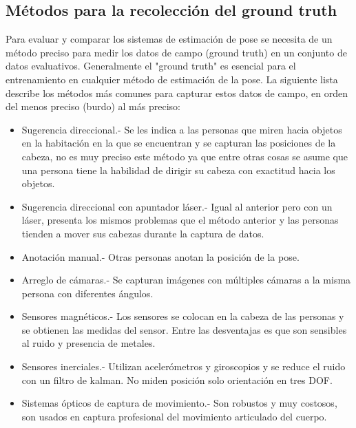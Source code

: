 \subsection{Métodos para la recolección del ground truth}
Para evaluar y comparar los sistemas de estimación de pose se necesita de un método preciso para medir los datos de campo (ground truth) en un conjunto de datos evaluativos. Generalmente el "ground truth" es esencial para el entrenamiento en cualquier método de estimación de la pose. La siguiente lista describe los métodos más comunes para capturar estos datos de campo, en orden del menos preciso (burdo) al más preciso:
\begin{itemize}
	\item Sugerencia direccional.- Se les indica a las personas que miren hacia objetos en la habitación en la que se encuentran y se capturan las posiciones de la cabeza, no es muy preciso este método ya que entre otras cosas se asume que una persona tiene la habilidad de dirigir su cabeza con exactitud hacia los objetos.
	\item Sugerencia direccional con apuntador láser.- Igual al anterior pero con un láser, presenta los mismos problemas que el método anterior y las personas tienden a mover sus cabezas durante la captura de datos.
	\item Anotación manual.- Otras personas anotan la posición de la pose.
	\item Arreglo de cámaras.- Se capturan imágenes con múltiples cámaras a la misma persona con diferentes ángulos.
	\item Sensores magnéticos.- Los sensores se colocan en la cabeza de las personas y se obtienen las medidas del sensor. Entre las desventajas es que son sensibles al ruido y presencia de metales.
	\item Sensores inerciales.- Utilizan acelerómetros y giroscopios y se reduce el ruido con un filtro de kalman. No miden posición solo orientación en tres DOF.
	\item Sistemas ópticos de captura de movimiento.- Son robustos y muy costosos, son usados en captura profesional del movimiento articulado del cuerpo.	
\end{itemize}

